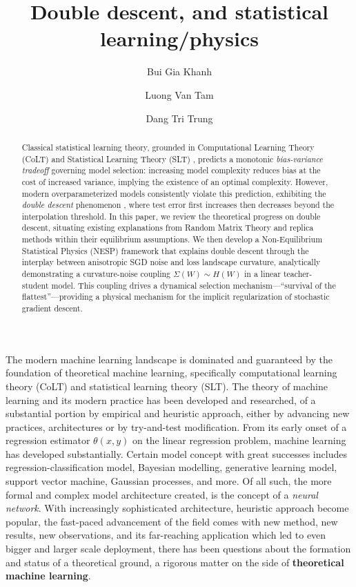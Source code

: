 \documentclass[
  journal=largetwo,
  year=2025,
  volume=37,
]{cup-journal}
\title{Double descent, and statistical learning/physics}
\author{Bui Gia Khanh}
\affiliation{Department of Physics, Hanoi University of Science, Vietnam National University, Hanoi Vietnam}
\author{Luong Van Tam}
\affiliation{Department of Physics, Hanoi University of Science, Vietnam National University, Hanoi Vietnam}
\author{Dang Tri Trung}
\affiliation{Monash University, Department of Computer Science, Melbourne, Australia}
\begin{document}
\begin{abstract}
    Classical statistical learning theory, grounded in Computational Learning Theory (CoLT) \cite{10.1145/1968.1972} and Statistical Learning Theory (SLT) \cite{Vapnik1999-VAPTNO}, predicts a monotonic \textit{bias-variance tradeoff} \cite{6797087} governing model selection: increasing model complexity reduces bias at the cost of increased variance, implying the existence of an optimal complexity. However, modern overparameterized models consistently violate this prediction, exhibiting the \textit{double descent} phenomenon \cite{belkin_reconciling_2019,nakkiran_deep_2019}, where test error first increases then decreases beyond the interpolation threshold. In this paper, we review the theoretical progress on double descent, situating existing explanations from Random Matrix Theory and replica methods within their equilibrium assumptions. We then develop a Non-Equilibrium Statistical Physics (NESP) framework that explains double descent through the interplay between anisotropic SGD noise and loss landscape curvature, analytically demonstrating a curvature-noise coupling $\Sigma(W) \sim H(W)$ in a linear teacher-student model. This coupling drives a dynamical selection mechanism---``survival of the flattest''---providing a physical mechanism for the implicit regularization of stochastic gradient descent.
\end{abstract}

The modern machine learning landscape is dominated and guaranteed by the foundation of theoretical machine learning, specifically computational learning theory (CoLT) and statistical learning theory (SLT). The theory of machine learning and its modern practice has been developed and researched, of a substantial portion by empirical and heuristic approach, either by advancing new practices, architectures or by try-and-test modification. From its early onset of a regression estimator $\theta(x,y)$ on the linear regression problem, machine learning has developed substantially. Certain model concept with great successes includes regression-classification model, Bayesian modelling, generative learning model, support vector machine, Gaussian processes, and more. Of all such, the more formal and complex model architecture created, is the concept of a \textit{neural network}. With increasingly sophisticated architecture, heuristic approach become popular, the fast-paced advancement of the field comes with new method, new results, new observations, and its far-reaching application which led to even bigger and larger scale deployment, there has been questions about the formation and status of a theoretical ground, a rigorous matter on the side of \textbf{theoretical machine learning}.
\end{document}
